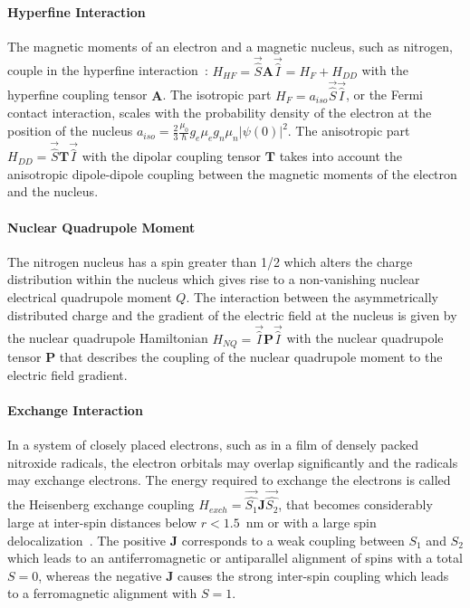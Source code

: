 \paragraph*{Hyperfine Interaction}
The magnetic moments of an electron and a magnetic nucleus, such as nitrogen, couple in the hyperfine interaction~\cite{Schweiger2001_hfi}: $H_{HF}=\vec{\hat{S}}\textbf{A}\vec{\hat{I}}=H_F+H_{DD}$ with the hyperfine coupling tensor $\textbf{A}$. The isotropic part $H_F=a_{iso}\vec{\hat{S}}\vec{\hat{I}}$, or the Fermi contact interaction, scales with the probability density of the electron at the position of the nucleus $a_{iso}=\frac{2}{3}\frac{\mu_0}{\hbar}g_e\mu_eg_n\mu_n\vert\psi(0)\vert^2$. The anisotropic part $H_{DD}=\vec{\hat{S}}\textbf{T}\vec{\hat{I}}$ with the dipolar coupling tensor $\textbf{T}$ takes into account the anisotropic dipole-dipole coupling between the magnetic moments of the electron and the nucleus.

\paragraph*{Nuclear Quadrupole Moment}
The nitrogen nucleus has a spin greater than 1/2 which alters the charge distribution within the nucleus which gives rise to a non-vanishing nuclear electrical quadrupole moment $Q$. The interaction between the asymmetrically distributed charge and the gradient of the electric field at the nucleus is given by the nuclear quadrupole Hamiltonian $H_{NQ}=\vec{\hat{I}}\textbf{P}\vec{\hat{I}}$ with the nuclear quadrupole tensor $\textbf{P}$ that describes the coupling of the nuclear quadrupole moment to the electric field gradient.

\paragraph*{Exchange Interaction}
In a system of closely placed electrons, such as in a film of densely packed nitroxide radicals, the electron orbitals may overlap significantly and the radicals may exchange electrons. The energy required to exchange the electrons is called the Heisenberg exchange coupling $H_{exch} = \vec{\hat{S_1}}\textbf{J}\vec{\hat{S_2}}$, that becomes considerably large at inter-spin distances below $r<1.5$~nm or with a large spin delocalization~\cite{Schweiger2001_exch}. The positive $\textbf{J}$ corresponds to a weak coupling between $S_1$ and $S_2$ which leads to an antiferromagnetic or antiparallel alignment of spins with a total $S=0$, whereas the negative $\textbf{J}$ causes the strong inter-spin coupling which leads to a ferromagnetic alignment with $S=1$.

